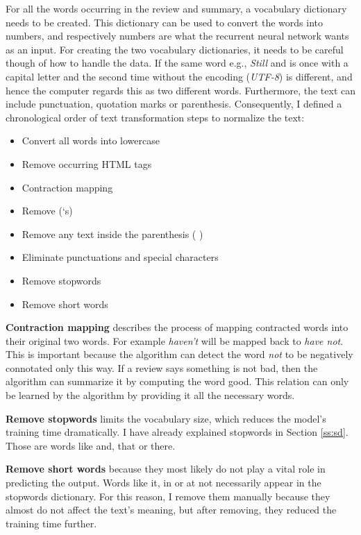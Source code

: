 For all the words occurring in the review and summary, a vocabulary dictionary needs to be created. This dictionary can be used to convert the words into numbers, and respectively numbers are what the recurrent neural network wants as an input. For creating the two vocabulary dictionaries, it needs to be careful though of how to handle the data. If the same word e.g., \textit{Still} and  is once with a capital letter and the second time without the encoding (\textit{UTF-8}) is different, and hence the computer regards this as two different words. Furthermore, the text can include punctuation, quotation marks or parenthesis. Consequently, I defined a chronological order of text transformation steps to normalize the text:

\begin{tcolorbox}
	\begin{itemize}
		\item Convert all words into lowercase
		\item Remove occurring HTML tags
		\item Contraction mapping
		\item Remove (‘s)
		\item Remove any text inside the parenthesis ( )
		\item Eliminate punctuations and special characters
		\item Remove stopwords
		\item Remove short words
	\end{itemize}
\end{tcolorbox}

\textbf{Contraction mapping} describes the process of mapping contracted words into their original two words. For example \textit{haven't} will be mapped back to \textit{have not}. This is important because the algorithm can detect the word \textit{not} to be negatively connotated only this way. If a review says something is not bad, then the algorithm can summarize it by computing the word good. This relation can only be learned by the algorithm by providing it all the necessary words.

\textbf{Remove stopwords} limits the vocabulary size, which reduces the model's training time dramatically. I have already explained stopwords in Section \ref{ss:sd}. Those are words like and, that or there. 

\textbf{Remove short words} because they most likely do not play a vital role in predicting the output. Words like it, in or at not necessarily appear in the stopwords dictionary. For this reason, I remove them manually because they almost do not affect the text's meaning, but after removing, they reduced the training time further. 

